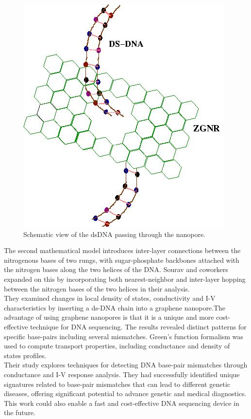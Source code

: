 \documentclass{article}
\begin{document}
\begin{figure}
    \centering
    \includegraphics[width=0.5\linewidth]{ds_dna.jpg}
    \caption{Schematic view of the dsDNA passing through the nanopore.}
    \label{fig:enter-label}
\end{figure}

The second mathematical model introduces inter-layer connections between the nitrogenous bases of two rungs, with sugar-phosphate backbones attached with the nitrogen bases along the two helices of the DNA. Sourav and coworkers expanded on this by incorporating both nearest-neighbor and inter-layer hopping between the nitrogen bases of the two helices in their analysis.\\

They examined changes in local density of states, conductivity and I-V characteristics by inserting a ds-DNA chain into a graphene nanopore.The advantage of using graphene nanopores is that it is a unique and more cost-effective technique for DNA sequencing. The results revealed distinct patterns for specific base-pairs including several mismatches. Green's function formalism was used to compute transport properties, including conductance and density of states profiles.\\

Their study explores techniques for detecting DNA base-pair mismatches through conductance and I-V response analysis. They had successfully identified unique signatures related to base-pair mismatches that can lead to different
genetic diseases, offering significant potential to advance genetic and medical diagnostics. This work could also enable a fast and cost-effective DNA sequencing device in the future.\\
\end{document}

